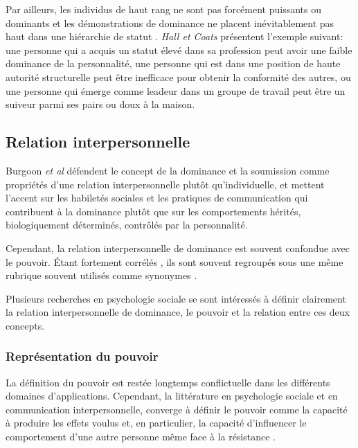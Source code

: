 		Par ailleurs, les individus de haut rang ne sont pas forcément puissants ou dominants et les démonstrations de dominance ne placent inévitablement pas haut dans une hiérarchie de statut \cite{burgoonnonverbal}. \emph{Hall et Coats} \cite{hall2005nonverbal} présentent l'exemple suivant: une personne qui a acquis un statut élevé dans sa profession peut avoir une faible dominance de la personnalité, une personne qui est dans une position de haute autorité structurelle peut être inefficace pour obtenir la conformité des autres, ou une personne qui émerge comme leadeur dans un groupe de travail peut être un suiveur parmi ses pairs ou doux à la maison.
		
		
		\subsection{Relation interpersonnelle}
			Burgoon \emph{et al} \cite{burgoon1998nature} défendent le concept de la dominance et la soumission comme propriétés d'une relation interpersonnelle plutôt qu'individuelle, et mettent l'accent sur les habiletés sociales et les pratiques de communication qui contribuent à la dominance plutôt que sur les comportements hérités, biologiquement déterminés, contrôlés par la personnalité.
			
			Cependant, la relation interpersonnelle de dominance est souvent confondue avec le pouvoir. Étant fortement corrélés \cite{dunbar2005perceptions}, ils sont souvent regroupés sous une même rubrique souvent utilisés comme synonymes  \cite{ellyson1985power,burgoon1998nature}.
			
			Plusieurs recherches en psychologie sociale \cite{burgoon1998nature,dunbar2005perceptions,burgoon2006nonverbal} se sont intéressés à définir clairement la relation interpersonnelle de dominance, le pouvoir et la relation entre ces deux concepts. 
			
			\subsubsection{Représentation du pouvoir}
			
			La définition du pouvoir est restée longtemps conflictuelle dans les différents domaines d'applications. Cependant, la littérature en psychologie sociale et en communication interpersonnelle, converge à définir le pouvoir comme la capacité à produire les effets voulus et, en particulier, la capacité d'influencer le comportement d'une autre personne même face à la résistance  \cite{burgoon2000interactionist,burgoon2006nonverbal,huston1983power}.
			

